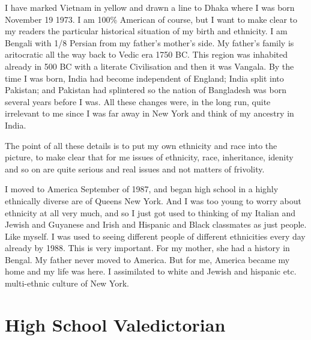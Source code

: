 \documentclass{amsart}
\begin{document}
I have marked Vietnam in yellow and drawn a line to Dhaka where I was born November 19 1973.  I am 100\% American of course, but I want to make clear to my readers the particular historical situation of my birth and ethnicity.  I am Bengali with 1/8 Persian from my father's mother's side.  My father's family is aritocratic all the way back to Vedic era 1750 BC.  This region was inhabited already in 500 BC with a literate Civilisation and then it was Vangala.  By the time I was born, India had become independent of England; India split into Pakistan; and Pakistan had splintered so the nation of Bangladesh was born several years before I was.  All these changes were, in the long run, quite irrelevant to me since I was far away in New York and think of my ancestry in India.

The point of all these details is to put my own ethnicity and race into the picture, to make clear that for me issues of ethnicity, race, inheritance, idenity and so on are quite serious and real issues and not matters of frivolity.  

I moved to America September of 1987, and began high school in a highly ethnically diverse are of Queens New York.  And I was too young to worry about ethnicity at all very much, and so I just got used to thinking of my Italian and Jewish and Guyanese and Irish and Hispanic and Black classmates as just people.  Like myself.  I was used to seeing different people of different ethnicities every day already by 1988.  This is very important.  For my mother, she had a history in Bengal.  My father never moved to America.  But for me, America became my home and my life was here.  I assimilated to white and Jewish and hispanic etc. multi-ethnic culture of New York.

\section{High School Valedictorian}
\end{document}
